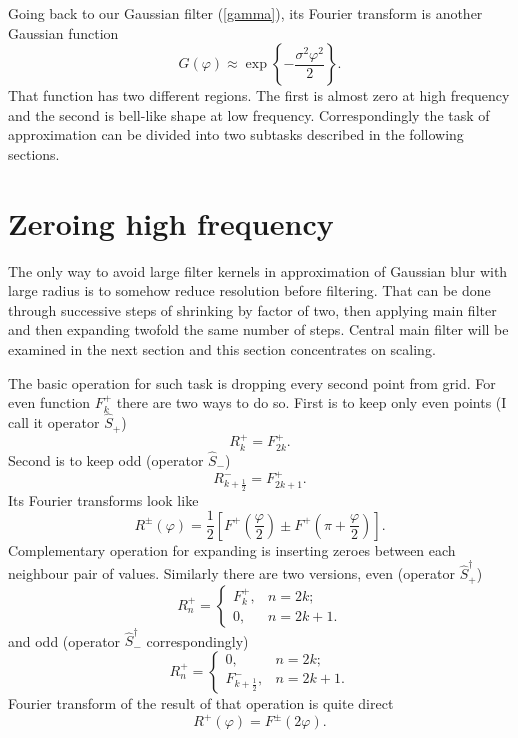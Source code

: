 \documentclass[10pt]{article}
\begin{document}
Going back to our Gaussian filter (\ref{gamma}), its Fourier transform is another Gaussian function
\begin{equation}\label{gauss}
    G(\varphi) \approx \exp\left\{-\frac{\sigma^2\varphi^2}2\right\}.
\end{equation}
That function has two different regions. The first is almost zero at high frequency and the second
is bell-like shape at low frequency. Correspondingly the task of approximation can be divided into
two subtasks described in the following sections.


\section{Zeroing high frequency}

The only way to avoid large filter kernels in approximation of Gaussian blur with large radius is to
somehow reduce resolution before filtering. That can be done through successive steps of shrinking
by factor of two, then applying main filter and then expanding twofold the same number of steps.
Central main filter will be examined in the next section and this section concentrates on scaling.

The basic operation for such task is dropping every second point from grid. For even function
$F^+_k$ there are two ways to do so. First is to keep only even points (I call it operator
$\hat S_+$)
\begin{equation}
    R^+_k = F^+_{2k}.
\end{equation}
Second is to keep odd (operator $\hat S_-$)
\begin{equation}
    R^-_{k+\frac12} = F^+_{2k+1}.
\end{equation}
Its Fourier transforms look like
\begin{equation}\label{S}
    R^\pm(\varphi) =
        \frac12 \left[F^+\left(\frac\varphi2\right) \pm F^+\left(\pi+\frac\varphi2\right)\right].
\end{equation}
Complementary operation for expanding is inserting zeroes between each neighbour pair of values.
Similarly there are two versions, even (operator $\hat S^\dagger_+$)
\begin{equation}
    R^+_n = \left\{
        \begin{array}{ll}
            F^+_k,& n = 2k;\\
            0,& n = 2k + 1.
        \end{array}
    \right.
\end{equation}
and odd (operator $\hat S^\dagger_-$ correspondingly)
\begin{equation}
    R^+_n = \left\{
        \begin{array}{ll}
            0,& n = 2k;\\
            F^-_{k+\frac12},& n = 2k + 1.
        \end{array}
    \right.
\end{equation}
Fourier transform of the result of that operation is quite direct
\begin{equation}
    R^+(\varphi) = F^\pm(2\varphi).
\end{equation}
\end{document}
